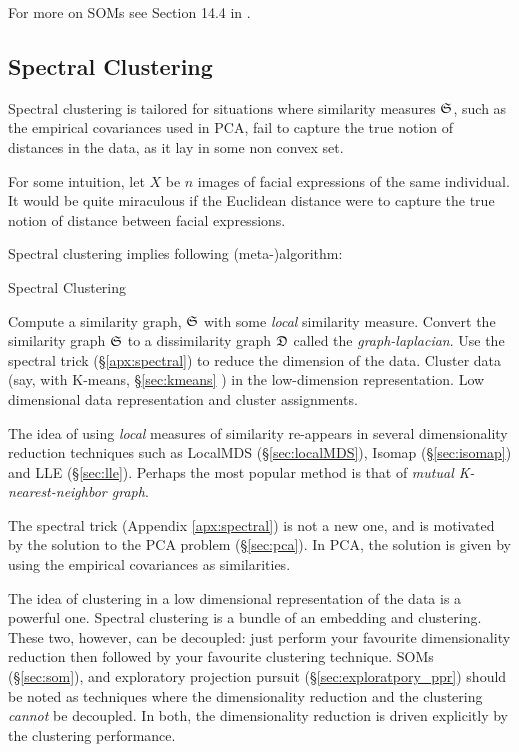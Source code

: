For more on SOMs see Section 14.4 in \cite{hastie_elements_2003}. 





\subsection{Spectral Clustering}
\label{sec:spectral_clustering}



Spectral clustering is tailored for situations where \naive similarity measures $\mathfrak{S}$, such as the empirical covariances used in PCA, fail to capture the true notion of distances in the data, as it lay in some non convex set. 

For some intuition, let $X$ be $n$ images of facial expressions of the same individual. It would be quite miraculous if the Euclidean distance were to capture the true notion of distance between facial expressions. 

Spectral clustering implies following (meta-)algorithm:
\begin{algorithm}[H]
\caption{Spectral Clustering}
\begin{algorithmic}
\State Compute a similarity graph, $\mathfrak{S}$ with some \emph{local} similarity measure.
\State Convert the similarity graph $\mathfrak{S}$ to a dissimilarity graph $\mathfrak{D}$ called the \emph{graph-laplacian}.
\State Use the spectral trick (\S\ref{apx:spectral}) to reduce the dimension of the data.
\State Cluster data (say, with K-means, \S\ref{sec:kmeans} ) in the low-dimension representation. 
\State \Return Low dimensional data representation and cluster assignments. 
\end{algorithmic}
\end{algorithm}



The idea of using \emph{local} measures of similarity re-appears in several dimensionality reduction techniques such as LocalMDS (\S\ref{sec:localMDS}), Isomap (\S\ref{sec:isomap}) and LLE (\S\ref{sec:lle}).
Perhaps the most popular method is that of \emph{mutual K-nearest-neighbor graph}.

The spectral trick (Appendix \ref{apx:spectral}) is not a new one, and is motivated by the solution to the PCA problem (\S\ref{sec:pca}). In PCA, the solution is given by using the empirical covariances as similarities. 

The idea of clustering in a low dimensional representation of the data is a powerful one. 
Spectral clustering is a bundle of an embedding and clustering. 
These two, however, can be decoupled: just perform your favourite dimensionality reduction then followed by your favourite clustering technique.
SOMs (\S\ref{sec:som}), and exploratory projection pursuit (\S\ref{sec:exploratpory_ppr}) should be noted as techniques where the dimensionality reduction and the clustering \emph{cannot} be decoupled. In both, the dimensionality reduction is driven explicitly by the clustering performance.  


